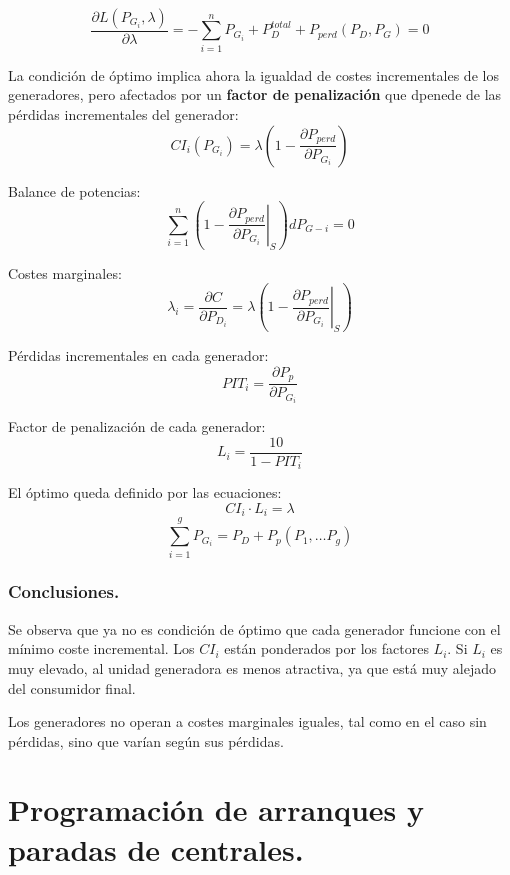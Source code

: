 				\[\dfrac{\partial L(P_{G_i},\lambda)}{\partial \lambda} = -\sum_{i=1}^{n} P_{G_i} + P_D^{total} + P_{perd}(P_D, P_G) = 0\]
				
				
				La condición de óptimo implica ahora la igualdad de costes incrementales de los generadores, pero afectados por un \textbf{factor de penalización} que dpenede de las pérdidas incrementales del generador:
				\[CI_i(P_{G_i}) = \lambda\left(1-\dfrac{\partial P_{perd}}{\partial P_{G_i}}\right)\]
				
				
				Balance de potencias:
				\[\sum_{i=1}^{n}\left(1-\left.\dfrac{\partial P_{perd}}{\partial P_{G_i}} \right|_S \right) dP_{G-i} = 0\]
				
				
				Costes marginales:
				\[\lambda_i = \dfrac{\partial C}{\partial P_{D_i}} = \lambda \left(1-\left.\dfrac{\partial P_{perd}}{\partial P_{G_i}} \right|_S \right)\]
				
				
				Pérdidas incrementales en cada generador:
				\[PIT_i = \dfrac{\partial P_p}{\partial P_{G_i}}\]
				
				
				Factor de penalización de cada generador:
				\[L_i = \dfrac{10}{1-PIT_i}\]
				
				
				El óptimo queda definido por las ecuaciones:
				\[CI_i\cdot L_i = \lambda\]
				\[\sum_{i=1}^{g} P_{G_i} = P_D + P_p(P_1,\dots P_g)\]
				
				
			\subsubsection{Conclusiones.}
				Se observa que ya no es condición de óptimo que cada generador funcione con el mínimo coste
				incremental. Los $CI_i$ están ponderados por los factores $L_i$. Si $L_i$ es muy elevado, al unidad generadora es menos atractiva, ya que está muy alejado del consumidor final.
				
				
				
				Los generadores no operan a costes marginales iguales, tal como en el caso sin pérdidas, sino que
				varían según sus pérdidas.
			
	\section{Programación de arranques y paradas de centrales.}
		\subsection{}
	